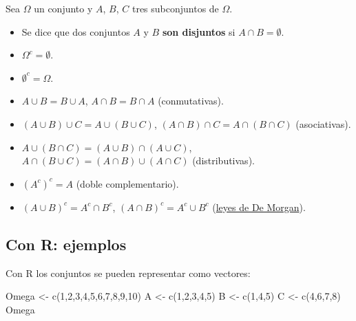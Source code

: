 \documentclass[
  letterpaper,
  DIV=11,
  numbers=noendperiod]{scrreprt}
\newenvironment{Shaded}{\begin{snugshade}}{\end{snugshade}}
\newcommand{\DecValTok}[1]{\textcolor[rgb]{0.68,0.00,0.00}{#1}}
\newcommand{\FunctionTok}[1]{\textcolor[rgb]{0.28,0.35,0.67}{#1}}
\newcommand{\NormalTok}[1]{\textcolor[rgb]{0.00,0.23,0.31}{#1}}
\newcommand{\OtherTok}[1]{\textcolor[rgb]{0.00,0.23,0.31}{#1}}
\providecommand{\tightlist}{%
  \setlength{\itemsep}{0pt}\setlength{\parskip}{0pt}}\usepackage{longtable,booktabs,array}
\begin{document}
Sea \(\Omega\) un conjunto y \(A\), \(B\), \(C\) tres subconjuntos de
\(\Omega\).

\begin{itemize}
\tightlist
\item
  Se dice que dos conjuntos \(A\) y \(B\) \textbf{son disjuntos} si
  \(A\cap B=\emptyset\).
\item
  \(\Omega^c=\emptyset\).
\item
  \(\emptyset^c=\Omega\).
\item
  \(A\cup B=B \cup A\), \(A\cap B=B\cap A\) (conmutativas).
\item
  \((A\cup B) \cup C = A \cup( B \cup C)\),
  \((A\cap B) \cap C = A \cap( B \cap C)\) (asociativas).
\item
  \(A\cup (B\cap C)=(A\cup B) \cap (A\cup C)\),
  \(A\cap (B\cup C)=(A\cap B) \cup (A\cap C)\) (distributivas).
\item
  \(\left(A^c\right)^c=A\) (doble complementario).
\item
  \(\left(A\cup B\right)^c=A^c \cap B^c\),
  \(\left(A\cap B\right)^c=A^c \cup B^c\)
  (\href{https://es.wikipedia.org/wiki/Leyes_de_De_Morgan}{leyes de De
  Morgan}).
\end{itemize}

\subsection{Con R: ejemplos}\label{con-r-ejemplos}

Con R los conjuntos se pueden representar como vectores:

\begin{Shaded}
\begin{Highlighting}[]
\NormalTok{Omega }\OtherTok{\textless{}{-}} \FunctionTok{c}\NormalTok{(}\DecValTok{1}\NormalTok{,}\DecValTok{2}\NormalTok{,}\DecValTok{3}\NormalTok{,}\DecValTok{4}\NormalTok{,}\DecValTok{5}\NormalTok{,}\DecValTok{6}\NormalTok{,}\DecValTok{7}\NormalTok{,}\DecValTok{8}\NormalTok{,}\DecValTok{9}\NormalTok{,}\DecValTok{10}\NormalTok{)}
\NormalTok{A }\OtherTok{\textless{}{-}} \FunctionTok{c}\NormalTok{(}\DecValTok{1}\NormalTok{,}\DecValTok{2}\NormalTok{,}\DecValTok{3}\NormalTok{,}\DecValTok{4}\NormalTok{,}\DecValTok{5}\NormalTok{)}
\NormalTok{B }\OtherTok{\textless{}{-}} \FunctionTok{c}\NormalTok{(}\DecValTok{1}\NormalTok{,}\DecValTok{4}\NormalTok{,}\DecValTok{5}\NormalTok{)}
\NormalTok{C }\OtherTok{\textless{}{-}} \FunctionTok{c}\NormalTok{(}\DecValTok{4}\NormalTok{,}\DecValTok{6}\NormalTok{,}\DecValTok{7}\NormalTok{,}\DecValTok{8}\NormalTok{)}
\NormalTok{Omega}
\end{Highlighting}
\end{Shaded}
\end{document}
